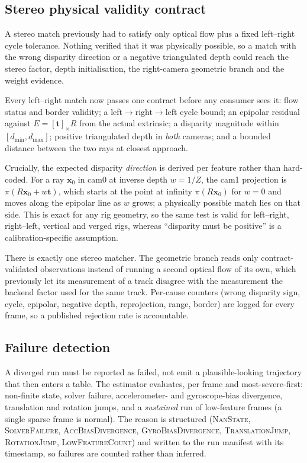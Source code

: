 \documentclass{ieeeaccess}
\begin{document}
\subsection{Stereo physical validity contract}
\label{sec:stereo}
A stereo match previously had to satisfy only optical flow plus a fixed left--right cycle tolerance. Nothing verified that it was physically possible, so a match with the wrong disparity direction or a negative triangulated depth could reach the stereo factor, depth initialisation, the right-camera geometric branch and the weight evidence.

Every left--right match now passes one contract before any consumer sees it: flow status and border validity; a left\(\to\)right\(\to\)left cycle bound; an epipolar residual against \(E=[\mathbf{t}]_\times R\) from the actual extrinsic; a disparity magnitude within \([d_{\min},d_{\max}]\); positive triangulated depth in \emph{both} cameras; and a bounded distance between the two rays at closest approach.

Crucially, the expected disparity \emph{direction} is derived per feature rather than hard-coded. For a ray \(\mathbf{x}_0\) in cam0 at inverse depth \(w=1/Z\), the cam1 projection is \(\pi(R\mathbf{x}_0 + w\mathbf{t})\), which starts at the point at infinity \(\pi(R\mathbf{x}_0)\) for \(w{=}0\) and moves along the epipolar line as \(w\) grows; a physically possible match lies on that side. This is exact for any rig geometry, so the same test is valid for left--right, right--left, vertical and verged rigs, whereas ``disparity must be positive'' is a calibration-specific assumption.

There is exactly one stereo matcher. The geometric branch reads only contract-validated observations instead of running a second optical flow of its own, which previously let its measurement of a track disagree with the measurement the backend factor used for the same track. Per-cause counters (wrong disparity sign, cycle, epipolar, negative depth, reprojection, range, border) are logged for every frame, so a published rejection rate is accountable.

\subsection{Failure detection}
\label{sec:failure}
A diverged run must be reported as failed, not emit a plausible-looking trajectory that then enters a table. The estimator evaluates, per frame and most-severe-first: non-finite state, solver failure, accelerometer- and gyroscope-bias divergence, translation and rotation jumps, and a \emph{sustained} run of low-feature frames (a single sparse frame is normal). The reason is structured (\textsc{NanState}, \textsc{SolverFailure}, \textsc{AccBiasDivergence}, \textsc{GyroBiasDivergence}, \textsc{TranslationJump}, \textsc{RotationJump}, \textsc{LowFeatureCount}) and written to the run manifest with its timestamp, so failures are counted rather than inferred.
\end{document}
